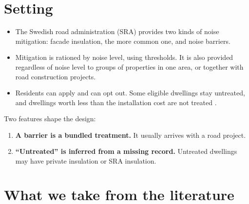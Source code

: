 \documentclass[11pt]{article}
\begin{document}
\section{Setting}

\begin{itemize}
\item The Swedish road administration (SRA) provides two kinds of noise mitigation: facade
  insulation, the more common one, and noise barriers.
\item Mitigation is rationed by noise level, using thresholds. It is also provided regardless
  of noise level to groups of properties in one area, or together with road construction
  projects.
\item Residents can apply and can opt out. Some eligible dwellings stay untreated, and
  dwellings worth less than the installation cost are not treated
  \autocite{lindgrenSoundEnvironmentHealth2021}.
\end{itemize}

Two features shape the design:
\begin{enumerate}
\item \textbf{A barrier is a bundled treatment.} It usually arrives with a road project.
\item \textbf{``Untreated'' is inferred from a missing record.} Untreated dwellings may have
  private insulation or SRA insulation.
\end{enumerate}

\section{What we take from the literature}\label{sec:literature}
\end{document}
